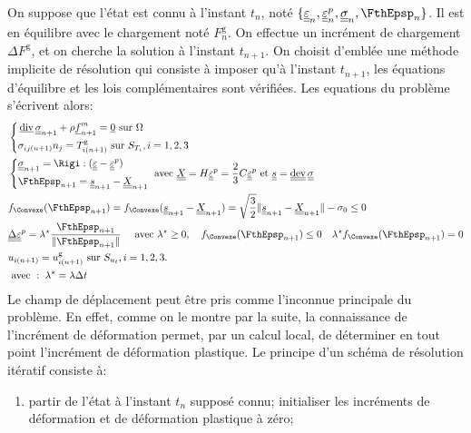 \documentclass[10pt]{book}
\begin{document}
\begin{appendices}
On suppose que l'état est connu à l'instant $t_{n}$, noté $\{\DefoHPP_{n},\DefoHPP_{n}^{p},\SC_{n},\FthEpsp_{n}\}$. Il est en équilibre avec le chargement noté $F_{n}^{\mathrm{g}}$. On effectue un incrément de chargement $\Delta F^{\mathrm{g}}$, et on cherche la solution à l'instant $t_{n+1}$. On choisit d'emblée une méthode implicite de résolution qui consiste à imposer qu'à l'instant $t_{n+1}$, les équations d'équilibre et les lois complémentaires sont vérifiées. Les equations du problème s'écrivent alors:
\begin{align}
&\left\{\begin{aligned}
&\vdiv\SC_{n+1}+\rho\FMass_{n+1}=\vec{0} \sur \Omega\\
&\sigma_{ij(n+1)}n_{j}=T_{i(n+1)}^{\mathrm{g}}\sur S_{T_{i}}, i=1, 2, 3\\	
\end{aligned}\right.\\\label{eq:loi_compo_increm_cin_lin}
&\left\{\begin{aligned}
&\SC_{n+1}=\Rigi:(\DefoHPP-\EpsP)\\
&\FthEpsp_{n+1}=\devia_{n+1}-\CentreConv_{n+1}\\
\end{aligned} \right. \avec\CentreConv=H \DefoHPP^{p}=\frac{2}{3}C\EpsP\et \devia=\dev\SC\\\label{eq:Fonction_charge_incre}
&\FChargeConvexe(\FthEpsp_{n+1})=\FChargeConvexe(\devia_{n+1}-\CentreConv_{n+1})=\sqrt{\frac{3}{2}}\Vert \devia_{n+1}-\CentreConv_{n+1}\Vert-\sigma_{0}\leq0\\\label{eq:Ecoulement_incre}
&\DeltaDefoHPP^{p}=\lambda^{\star}\frac{\FthEpsp_{n+1}}{\Vert \FthEpsp_{n+1}\Vert} \quad \avec \lambda^{\star}\geq 0, \quad \FChargeConvexe(\FthEpsp_{n+1})\leq 0 \quad \lambda^{\star}\FChargeConvexe(\FthEpsp_{n+1})=0\\
&u_{i(n+1)}=u_{i(n+1)}^{\mathrm{g}} \sur S_{u_{t}}, i=1, 2, 3.\\
&\avec: \; \lambda^{\star}=\lambda\Delta t
\end{align}
Le champ de déplacement peut être pris comme l'inconnue principale du problème. En effet, comme on le montre par la suite, la connaissance de l'incrément de déformation permet, par un calcul local, de déterminer en tout point l'incrément de déformation plastique. Le principe d'un schéma de résolution itératif consiste à:
\begin{enumerate}
\item partir de l'état à l'instant $t_{n}$ supposé connu; initialiser les incréments de déformation et de déformation plastique à zéro;

\end{enumerate}
\end{appendices}
\end{document}
